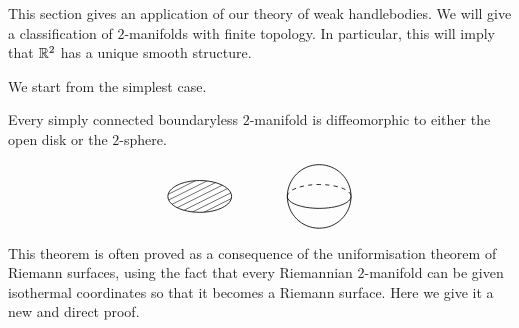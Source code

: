 This section gives an application of our
theory of weak handlebodies.
We will give a classification of $2$-manifolds with finite topology.
In particular, this will imply that $\mathbb{R}^2$ has a unique smooth structure.

We start from the simplest case.

\begin{theorem}\label{thm:2-mfd}
Every simply connected boundaryless $2$-manifold is diffeomorphic to
either the open disk or the $2$-sphere.
\end{theorem}

\[ \begin{tikzpicture}[line width=.6]
    \draw (0,0) ellipse (.8 and .4);
    \begin{scope}
        \clip (0,0) ellipse (.8 and .4);
        \draw[thin] (1.7,.4) -- (.1,-.4)
                    (1.4,.4) -- (-.2,-.4)
                    (1.1,.4) -- (-.5,-.4)
                    (.8,.4) -- (-.8,-.4)
                    (.5,.4) -- (-1.1,-.4)
                    (.2,.4) -- (-1.4,-.4)
                    (-.1,.4) -- (-1.7,-.4);
    \end{scope}
    \draw (3,0) circle (.8);
    \draw[dashed] (2.2,0) arc (180:0:.8 and .3);
    \draw (2.2,0) arc (180:360:.8 and .3);
\end{tikzpicture} \]

This theorem is often proved as a consequence of
the uniformisation theorem of Riemann surfaces,
using the fact that every Riemannian $2$-manifold can be given isothermal coordinates
so that it becomes a Riemann surface.
Here we give it a new and direct proof.

